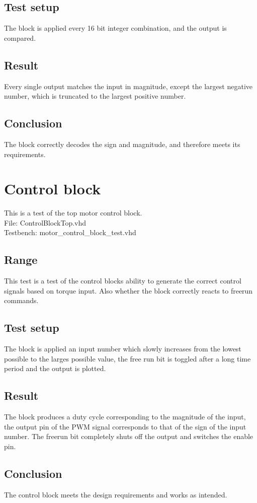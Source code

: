 \subsection{Test setup}
The block is applied every 16 bit integer combination, and the output is compared.
\subsection{Result}
Every single output matches the input in magnitude, except the largest negative number, which is truncated to the largest positive number.
\subsection{Conclusion}
The block correctly decodes the sign and magnitude, and therefore meets its requirements.

\section{Control block}
This is a test of the top motor control block.\\
File: ControlBlockTop.vhd\\
Testbench: motor\_control\_block\_test.vhd
\subsection{Range}
This test is a test of the control blocks ability to generate the correct control signals based on torque input. Also whether the block correctly reacts to freerun commands.
\subsection{Test setup}
The block is applied an input number which slowly increases from the lowest possible to the larges possible value, the free run bit is toggled after a long time period and the output is plotted.
\subsection{Result}
The block produces a duty cycle corresponding to the magnitude of the input, the output pin of the PWM signal corresponds to that of the sign of the input number. The freerun bit completely shuts off the output and switches the enable pin.
\subsection{Conclusion}
The control block meets the design requirements and works as intended.

